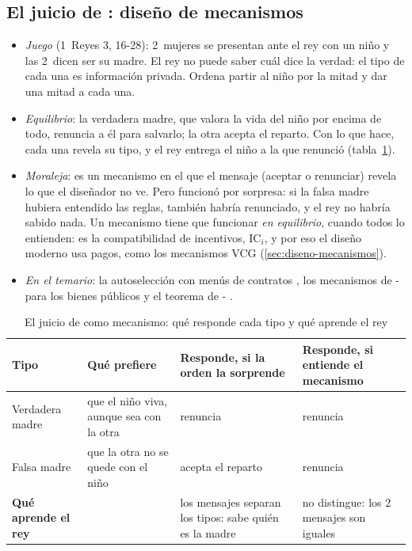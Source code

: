 \documentclass[11pt]{article}
\begin{document}
\subsection*{El juicio de : diseño de mecanismos}

\begin{itemize}
\item \emph{Juego} (1~Reyes 3, 16-28): 2~mujeres se presentan ante el rey  con un niño y las 2~dicen ser su madre. El rey no puede saber cuál dice la verdad: el tipo de cada una es información privada. Ordena partir al niño por la mitad y dar una mitad a cada una.
\item \emph{Equilibrio}: la verdadera madre, que valora la vida del niño por encima de todo, renuncia a él para salvarlo; la otra acepta el reparto. Con lo que hace, cada una revela su tipo, y el rey entrega el niño a la que renunció (tabla~\ref{tab:salomon}).
\item \emph{Moraleja}: es un mecanismo en el que el mensaje (aceptar o renunciar) revela lo que el diseñador no ve. Pero funcionó por sorpresa: si la falsa madre hubiera entendido las reglas, también habría renunciado, y el rey no habría sabido nada. Un mecanismo tiene que funcionar \emph{en equilibrio}, cuando todos lo entienden: es la compatibilidad de incentivos, $\mathrm{IC}_i$, y por eso el diseño moderno usa pagos, como los mecanismos VCG (\ref{sec:diseno-mecanismos}).
\item \emph{En el temario}: la autoselección con menús de contratos , los mecanismos de - para los bienes públicos  y el teorema de - .
\end{itemize}

\begin{table}[H]
\centering
\caption{El juicio de  como mecanismo: qué responde cada tipo y qué aprende el rey}\label{tab:salomon}
\begin{tabular}{>{\raggedright\arraybackslash}m{2.8cm}>{\raggedright\arraybackslash}m{4.0cm}>{\raggedright\arraybackslash}m{3.4cm}>{\raggedright\arraybackslash}m{3.4cm}}
\toprule
\rowcolor{tceeazulpalido}\textbf{Tipo} & \textbf{Qué prefiere} & \textbf{Responde, si la orden la sorprende} & \textbf{Responde, si entiende el mecanismo}\\
\midrule
Verdadera madre & que el niño viva, aunque sea con la otra & renuncia & renuncia\\
\addlinespace[0.3em]
Falsa madre & que la otra no se quede con el niño & acepta el reparto & renuncia\\
\addlinespace[0.3em]
\textbf{Qué aprende el rey} & & \cellcolor{tceesalvia}los mensajes separan los tipos: sabe quién es la madre & no distingue: los 2 mensajes son iguales\\
\bottomrule
\end{tabular}
\end{table}
\end{document}
